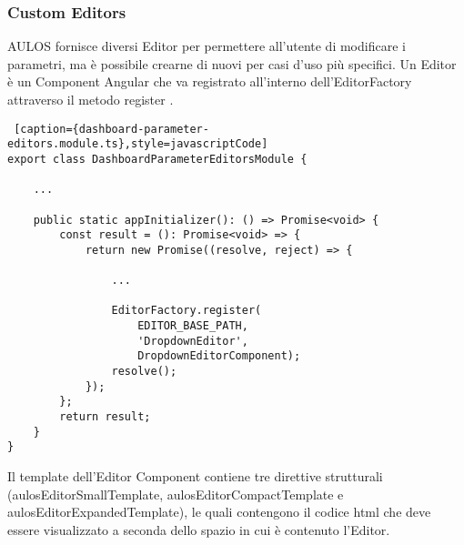\subsubsection{Custom Editors}
AULOS fornisce diversi Editor per permettere all'utente di modificare i parametri, ma è possibile crearne di nuovi per casi d'uso più specifici. Un Editor è un Component Angular che va registrato all'interno dell'EditorFactory attraverso il metodo register .\\
\begin{lstlisting} [caption={dashboard-parameter-editors.module.ts},style=javascriptCode]
export class DashboardParameterEditorsModule {

    ...

    public static appInitializer(): () => Promise<void> {
        const result = (): Promise<void> => {
            return new Promise((resolve, reject) => {
            
                ...
                
                EditorFactory.register(
                    EDITOR_BASE_PATH,
                    'DropdownEditor',
                    DropdownEditorComponent);
                resolve();
            });
        };
        return result;
    }
}
\end{lstlisting}
Il template dell'Editor Component contiene tre direttive strutturali (aulosEditorSmallTemplate, aulosEditorCompactTemplate e aulosEditorExpandedTemplate), le quali contengono il codice html che deve essere visualizzato a seconda dello spazio in cui è contenuto l'Editor.
